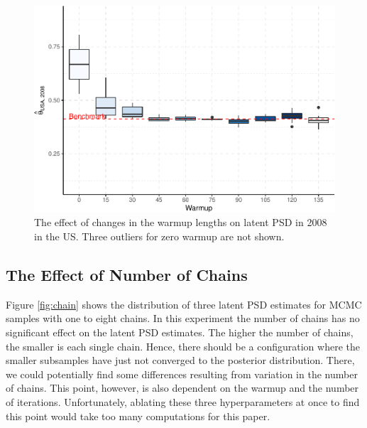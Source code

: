 \documentclass[12pt,english,a4paper,oneside]{article}
\theoremstyle{definition}
\theoremstyle{definition}
\theoremstyle{definition}
\theoremstyle{definition}
\theoremstyle{remark}
\begin{document}
\begin{figure}[H]
\includegraphics[width=\textwidth]{figs/warmup-1} \caption[The effect of changes in the warmup lengths on latent PSD in 2008 in the US]{The effect of changes in the warmup lengths on latent PSD in 2008 in the US. Three outliers for zero warmup are not shown.}\label{fig:warmup}
\end{figure}

\hypertarget{the-effect-of-number-of-chains}{%
\subsection{The Effect of Number of Chains}\label{the-effect-of-number-of-chains}}

Figure \ref{fig:chain} shows the distribution of three latent PSD estimates for MCMC samples with one to eight chains. In this experiment the number of chains has no significant effect on the latent PSD estimates. The higher the number of chains, the smaller is each single chain. Hence, there should be a configuration where the smaller subsamples have just not converged to the posterior distribution. There, we could potentially find some differences resulting from variation in the number of chains. This point, however, is also dependent on the warmup and the number of iterations. Unfortunately, ablating these three hyperparameters at once to find this point would take too many computations for this paper.
\end{document}

